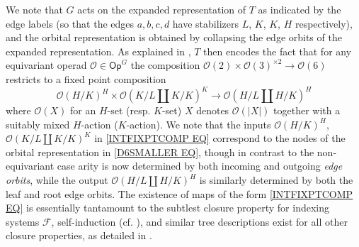 \documentclass[a4paper,10pt
,draft
]{article}%
\numberwithin{equation}{section}
\numberwithin{figure}{section}
\theoremstyle{definition} %
\renewcommand{\O}{\ensuremath{\mathcal O}}
\newcommand{\1}{\ensuremath{\mathbbm 1}}%
\begin{document}
We note that $G$ acts on the expanded representation of $T$ as indicated by the edge labels (so that the edges $a,b,c,d$ have stabilizers $L$, $K$, $K$, $H$ respectively), and the orbital representation is obtained by collapsing the edge orbits of the expanded representation. As explained in \cite[Example 4.9]{Pe17}, $T$ then encodes the fact that for any 
equivariant operad $\O \in \mathsf{Op}^G$ the composition 
$\mathcal{O}(2) \times \mathcal{O}(3)^{\times 2} \to 
\mathcal{O}(6)$ restricts to a fixed point composition
\begin{equation}\label{INTFIXPTCOMP EQ}
\O(H/K)^{H} \times \O(K/L \amalg K/K)^{K} \to
\O(H/L \amalg H/K)^{H}
\end{equation}
where $\O(X)$ for an $H$-set (resp. $K$-set) $X$ denotes $\O(|X|)$ together with a suitably mixed $H$-action ($K$-action).
We note that the inputs 
$\O(H/K)^{H}$, $\O(K/L \amalg K/K)^{K}$ in
\eqref{INTFIXPTCOMP EQ}
correspond to the nodes of the orbital representation
in \eqref{D6SMALLER EQ}, though in contrast to the non-equivariant case arity is now determined by both incoming and outgoing \textit{edge orbits}, while the output 
$\O(H/L \amalg H/K)^{H}$
is similarly determined by both the leaf and root edge orbits.
The existence of maps of the form \eqref{INTFIXPTCOMP EQ} is essentially tantamount to the subtlest 
closure property for indexing systems $\mathcal{F}$,
self-induction (cf. \cite[Def. 3.20]{BH15}),
and similar tree descriptions exist for all other closure properties, as detailed in 
\cite[\S 9]{Pe17}.
\end{document}
